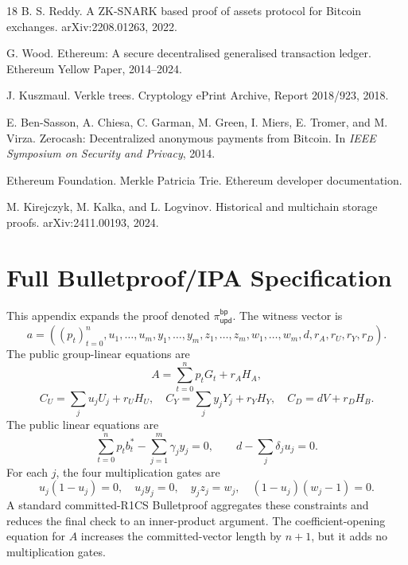 \documentclass[runningheads]{llncs}
\begin{document}
\begin{thebibliography}{18}
B. S. Reddy.
\newblock A ZK-SNARK based proof of assets protocol for Bitcoin exchanges.
\newblock arXiv:2208.01263, 2022.

G. Wood.
\newblock Ethereum: A secure decentralised generalised transaction ledger.
\newblock Ethereum Yellow Paper, 2014--2024.

J. Kuszmaul.
\newblock Verkle trees.
\newblock Cryptology ePrint Archive, Report 2018/923, 2018.

E. Ben-Sasson, A. Chiesa, C. Garman, M. Green, I. Miers, E. Tromer, and M. Virza.
\newblock Zerocash: Decentralized anonymous payments from Bitcoin.
\newblock In \emph{IEEE Symposium on Security and Privacy}, 2014.

Ethereum Foundation.
\newblock Merkle Patricia Trie.
\newblock Ethereum developer documentation.

M. Kirejczyk, M. Kalka, and L. Logvinov.
\newblock Historical and multichain storage proofs.
\newblock arXiv:2411.00193, 2024.

\end{thebibliography}

\appendix
\setcounter{section}{0}
\renewcommand{\thesection}{\Alph{section}}
\renewcommand{\theHsection}{appendix.\Alph{section}}

\section{Full Bulletproof/IPA Specification}\label{app:bp}

This appendix expands the proof denoted \(\pi_{\mathsf{upd}}^{\mathsf{bp}}\).  The witness vector is
\[
        a=((p_t)_{t=0}^n,u_1,\ldots,u_m,y_1,\ldots,y_m,z_1,\ldots,z_m,w_1,\ldots,w_m,d,r_A,r_U,r_Y,r_D).
\]
The public group-linear equations are
\[
 A=\sum_{t=0}^np_tG_t+r_AH_A,
\]
\[
 C_U=\sum_j u_jU_j+r_UH_U,
 \quad
 C_Y=\sum_j y_jY_j+r_YH_Y,
 \quad
 C_D=dV+r_DH_B.
\]
The public linear equations are
\[
        \sum_{t=0}^np_tb_t^*-\sum_{j=1}^m\gamma_jy_j=0,
        \qquad
        d-\sum_j\delta_ju_j=0.
\]
For each \(j\), the four multiplication gates are
\[
 u_j(1-u_j)=0,
 \quad u_jy_j=0,
 \quad y_jz_j=w_j,
 \quad (1-u_j)(w_j-1)=0.
\]
A standard committed-R1CS Bulletproof aggregates these constraints and reduces the final check to an inner-product argument.  The coefficient-opening equation for \(A\) increases the committed-vector length by \(n+1\), but it adds no multiplication gates.
\end{document}
